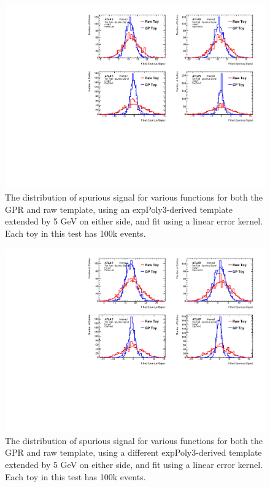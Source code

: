 \begin{figure} 
\begin{center}
  \includegraphics[width=\textwidth]{figures/background/gpr/validation/linear/ToyTest_FitSigVals_medpT_100k_noSig}   
\caption{The distribution of spurious signal for various functions for both the GPR and raw template, using an expPoly3-derived template extended by 5 GeV on either side, and fit using a linear error kernel. Each toy in this test has 100k events.}
\label{fig:linearkernel_medpt_100k_noSig}
\end{center}
\end{figure}

\begin{figure} 
\begin{center}
  \includegraphics[width=\textwidth]{figures/background/gpr/validation/linear/ToyTest_FitSigVals_highpT_100k_noSig}   
\caption{The distribution of spurious signal for various functions for both the GPR and raw template, using a different expPoly3-derived template extended by 5 GeV on either side, and fit using a linear error kernel. Each toy in this test has 100k events.}
\label{fig:linearkernel_highpt_100k_noSig}
\end{center}
\end{figure}

